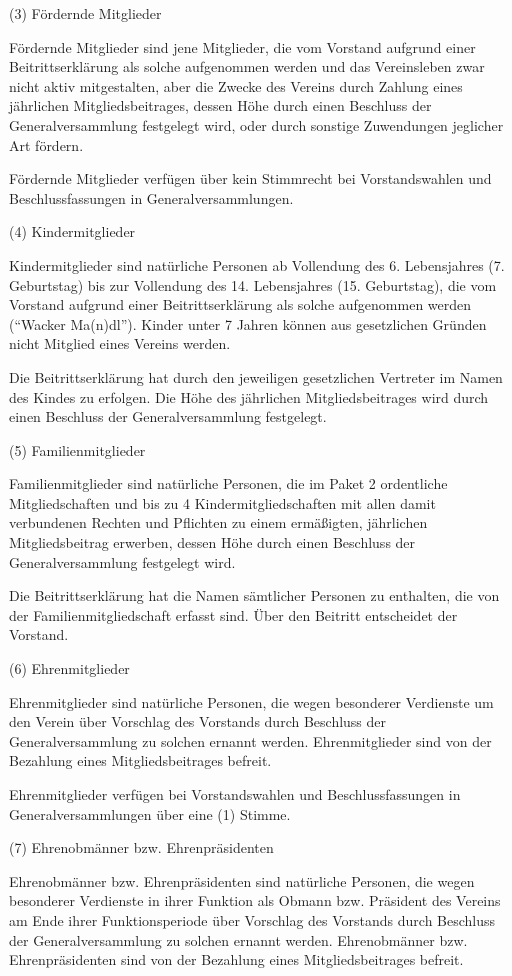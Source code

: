 \documentclass[11pt,a4paper]{article}
\begin{document}
(3)
Fördernde Mitglieder

Fördernde Mitglieder sind jene Mitglieder, die vom Vorstand aufgrund einer Beitrittserklärung als solche aufgenommen werden und das Vereinsleben zwar nicht aktiv mitgestalten, aber die Zwecke des Vereins durch Zahlung eines jährlichen Mitgliedsbeitrages, dessen Höhe durch einen Beschluss der Generalversammlung festgelegt wird, oder durch sonstige Zuwendungen jeglicher Art fördern.

Fördernde Mitglieder verfügen über kein Stimmrecht bei Vorstandswahlen und Beschlussfassungen in Generalversammlungen.

(4)
Kindermitglieder

Kindermitglieder sind natürliche Personen ab Vollendung des 6. Lebensjahres (7. Geburtstag) bis zur Vollendung des 14. Lebensjahres (15. Geburtstag), die vom Vorstand aufgrund einer Beitrittserklärung als solche aufgenommen werden ("`Wacker Ma(n)dl"').
Kinder unter 7 Jahren können aus gesetzlichen Gründen nicht Mitglied eines Vereins werden.

Die Beitrittserklärung hat durch den jeweiligen gesetzlichen Vertreter im Namen des Kindes zu erfolgen.
Die Höhe des jährlichen Mitgliedsbeitrages wird durch einen Beschluss der Generalversammlung festgelegt.

(5)
Familienmitglieder

Familienmitglieder sind natürliche Personen, die im Paket 2 ordentliche Mitgliedschaften und bis zu 4 Kindermitgliedschaften mit allen damit verbundenen Rechten und Pflichten zu einem ermäßigten, jährlichen Mitgliedsbeitrag erwerben, dessen Höhe durch einen Beschluss der Generalversammlung festgelegt wird.

Die Beitrittserklärung hat die Namen sämtlicher Personen zu enthalten, die von der Familienmitgliedschaft erfasst sind.
Über den Beitritt entscheidet der Vorstand.

(6)
Ehrenmitglieder

Ehrenmitglieder sind natürliche Personen, die wegen besonderer Verdienste um den Verein über Vorschlag des Vorstands durch Beschluss der Generalversammlung zu solchen ernannt werden.
Ehrenmitglieder sind von der Bezahlung eines Mitgliedsbeitrages befreit.

Ehrenmitglieder verfügen bei Vorstandswahlen und Beschlussfassungen in Generalversammlungen über eine (1) Stimme.

(7)
Ehrenobmänner bzw. Ehrenpräsidenten

Ehrenobmänner bzw. Ehrenpräsidenten sind natürliche Personen, die wegen besonderer Verdienste in ihrer Funktion als Obmann bzw. Präsident des Vereins am Ende ihrer Funktionsperiode über Vorschlag des Vorstands durch Beschluss der Generalversammlung zu solchen ernannt werden.
Ehrenobmänner bzw. Ehrenpräsidenten sind von der Bezahlung eines Mitgliedsbeitrages befreit.
\end{document}
